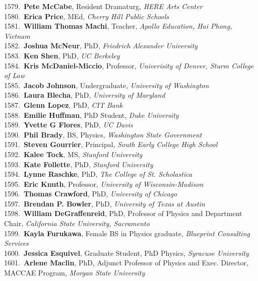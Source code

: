 1579.~{\bf Pete McCabe}, Resident Dramaturg, {\sl HERE Arts Center} \\
1580.~{\bf Erica Price}, MEd, {\sl Cherry Hill Public Schools} \\
1581.~{\bf William Thomas Machi}, Teacher, {\sl Apollo Education, Hai Phong, Vietnam} \\
1582.~{\bf Joshua McNeur}, PhD, {\sl Friedrich Alexander University} \\
1583.~{\bf Ken Shen}, PhD, {\sl UC Berkeley} \\
1584.~{\bf Kris McDaniel-Miccio}, Professor, {\sl Univerisity of Denver, Sturm College of Law} \\
1585.~{\bf Jacob Johnson}, Undergraduate, {\sl University of Washington} \\
1586.~{\bf Laura Blecha}, PhD, {\sl University of Maryland} \\
1587.~{\bf Glenn Lopez}, PhD, {\sl CIT Bank} \\
1588.~{\bf Emilie Huffman}, PhD Student, {\sl Duke University} \\
1589.~{\bf Yvette G Flores}, PhD, {\sl UC Davis} \\
1590.~{\bf Phil Brady}, BS, Physics, {\sl Washington State Government} \\
1591.~{\bf Steven Gourrier}, Principal, {\sl South Early College High School} \\
1592.~{\bf Kalee Tock}, MS, {\sl Stanford University} \\
1593.~{\bf Kate Follette}, PhD, {\sl Stanford University} \\
1594.~{\bf Lynne Raschke}, PhD, {\sl The College of St. Scholastica} \\
1595.~{\bf Eric Knuth}, Professor, {\sl University of Wisconsin-Madison} \\
1596.~{\bf Thomas Crawford}, PhD, {\sl University of Chicago} \\
1597.~{\bf Brendan P. Bowler}, PhD, {\sl University of Texas at Austin} \\
1598.~{\bf William DeGraffenreid}, PhD, Professor of Physics and Department Chair, {\sl California State University, Sacramento} \\
1599.~{\bf Kayla Furukawa}, Female BS in Physics graduate, {\sl Blueprint Consulting Services} \\
1600.~{\bf Jessica Esquivel}, Graduate Student, PhD Physics, {\sl Syracuse University } \\
1601.~{\bf Arlene Maclin}, PhD, Adjunct Professor of Physics and Exec. Director, MACCAE Program, {\sl Morgan State University} \\
